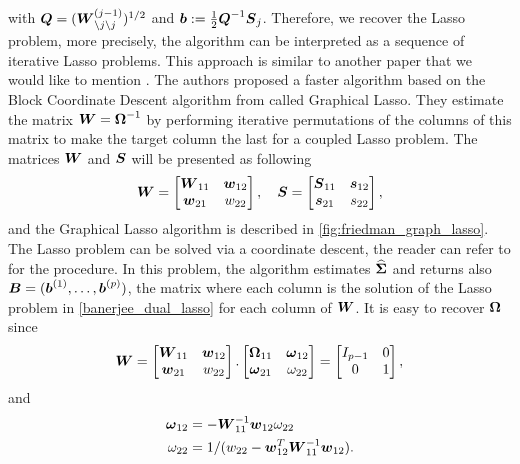 with $\boldsymbol Q = (\boldsymbol W_{\setminus j \setminus j}^{(j-1)})^{1/2}$ and $\boldsymbol b:=\frac{1}{2}\boldsymbol Q^{-1}\boldsymbol S_j$. Therefore, we recover the Lasso problem, more precisely, the algorithm can be interpreted as a sequence of iterative Lasso problems. This approach is similar to another paper that we would like to mention \citep{glasso07}. The authors proposed a faster algorithm based on the Block Coordinate Descent algorithm from \citep{banerjee} called Graphical Lasso. They estimate the matrix $\boldsymbol W=\boldsymbol\Omega^{-1}$ by performing iterative permutations of the columns of this matrix to make the target column the last for a coupled Lasso problem. The matrices $\boldsymbol W$ and $\boldsymbol S$ will be presented as following 
\begin{equation}
\boldsymbol W =  \begin{bmatrix}
    \boldsymbol W_{11} & \boldsymbol w_{12} \\
    \boldsymbol w_{21} & w_{22}
  \end{bmatrix}, 
  \quad
 \boldsymbol S =  \begin{bmatrix}
    \boldsymbol S_{11} & \boldsymbol s_{12} \\
    \boldsymbol s_{21} & s_{22}
  \end{bmatrix}, 
\end{equation}
and the Graphical Lasso algorithm is described in \cref{fig:friedman_graph_lasso}. The Lasso problem can be solved via a coordinate descent, the reader can refer to \citep{glasso07} for the procedure. In this problem, the algorithm estimates $\widehat{\boldsymbol\Sigma}$ and returns also $\boldsymbol B = (\boldsymbol b^{(1)},\dots,\boldsymbol b^{(p)})$, the matrix where each column is the solution of the Lasso problem in \cref{banerjee_dual_lasso} for each column of $\boldsymbol W$. It is easy to recover $\boldsymbol\Omega$ since 
\begin{equation}
\boldsymbol W =  \begin{bmatrix}
    \boldsymbol W_{11} & \boldsymbol w_{12} \\
    \boldsymbol w_{21} & w_{22}
  \end{bmatrix}.
  \begin{bmatrix}
    \boldsymbol\Omega_{11} & \boldsymbol \omega_{12} \\
    \boldsymbol \omega_{21} & \omega_{22}
  \end{bmatrix}=
   \begin{bmatrix}
    I_{p-1} & 0 \\
    0 & 1
  \end{bmatrix},
\end{equation}
and
\begin{align*}
  \boldsymbol \omega_{12} &= -\boldsymbol W_{11}^{-1}\boldsymbol w_{12}\omega_{22}\\
  \omega_{22} &= 1/(w_{22}-\boldsymbol w_{12}^T \boldsymbol W_{11}^{-1}\boldsymbol w_{12}).
\end{align*}
